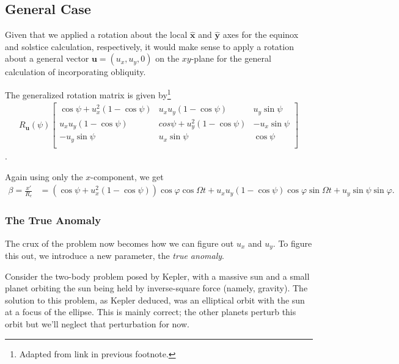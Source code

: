 \documentclass[10pt]{article}
\begin{document}
\subsection{General Case}

Given that we applied a rotation about the local $\mathbf{\hat{x}}$ and $\mathbf{\hat{y}}$ axes for the equinox and solstice calculation, respectively, it would make sense to apply a rotation about a general vector $\mathbf{u} = (u_x, u_y, 0)$ on the $xy$-plane for the general calculation of incorporating obliquity.

\vspace{10pt}
The generalized rotation matrix is given by\footnote{Adapted from link in previous footnote.}
\begin{align}
R_{\mathbf{u}}(\psi)
\left[ \begin{array}{ccc}
	\cos \psi + u_x^2 (1-\cos \psi) & u_x u_y (1-\cos \psi) & u_y \sin \psi \\
	u_x u_y (1-\cos \psi) & cos \psi + u_y^2 (1-\cos \psi) & -u_x \sin \psi \\
	-u_y \sin \psi &  u_x \sin \psi & \cos \psi\\
\end{array} \right]
\end{align}.

Again using only the $x$-component, we get
\begin{align} \label{eq:generalcase_start}
\beta = \frac{x'}{R_e} &= (\cos \psi + u_x^2 (1-\cos \psi))\cos \varphi \cos \Omega t + u_x u_y (1-\cos \psi)\cos \varphi \sin \Omega t + u_y \sin \psi \sin \varphi.
\end{align}

\subsubsection{The True Anomaly}

The crux of the problem now becomes how we can figure out $u_x$ and $u_y$. To figure this out, we introduce a new parameter, the \emph{true anomaly}.

\vspace{10pt}
Consider the two-body problem posed by Kepler, with a massive sun and a small planet orbiting the sun being held by inverse-square force (namely, gravity). The solution to this problem, as Kepler deduced, was an elliptical orbit with the sun at a focus of the ellipse. This is mainly correct; the other planets perturb this orbit but we'll neglect that perturbation for now.
\end{document}

